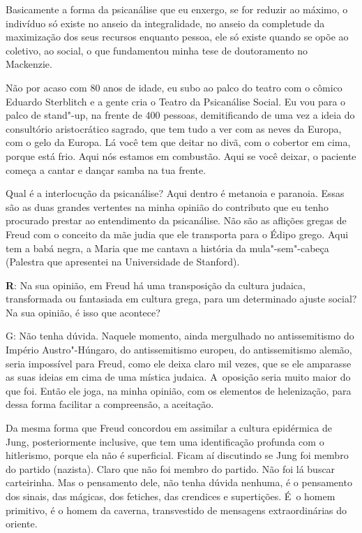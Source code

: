  

Basicamente a forma da psicanálise que eu enxergo, se for reduzir ao
máximo, o indivíduo só existe no anseio da integralidade, no anseio da
completude da maximização dos seus recursos enquanto pessoa, ele só
existe quando se opõe ao coletivo, ao social, o que fundamentou minha
tese de doutoramento no Mackenzie.

 

Não por acaso com 80 anos de idade, eu subo ao palco do teatro com o
cômico Eduardo Sterblitch e a gente cria o Teatro da Psicanálise Social.
Eu vou para o palco de stand"-up, na frente de 400 pessoas, demitificando
de uma vez a ideia do consultório aristocrático sagrado, que tem tudo a
ver com as neves da Europa, com o gelo da Europa. Lá você tem que deitar
no divã, com o cobertor em cima, porque está frio. Aqui nós estamos em
combustão. Aqui se você deixar, o paciente começa a cantar e dançar
samba na tua frente.

 

Qual é a interlocução da psicanálise? Aqui dentro é metanoia e paranoia.
Essas são as duas grandes vertentes na minha opinião do contributo que
eu tenho procurado prestar ao entendimento da psicanálise. Não são as
aflições gregas de Freud com o conceito da mãe judia que ele transporta
para o Édipo grego. Aqui tem a babá negra, a Maria que me cantava a
história da mula"-sem"-cabeça (Palestra que apresentei na Universidade de
Stanford).

 

\textbf{R}: Na sua opinião, em Freud há uma transposição da cultura
judaica, transformada ou fantasiada em cultura grega, para um
determinado ajuste social? Na sua opinião, é isso que acontece?

 

G: Não tenha dúvida. Naquele momento, ainda mergulhado no antissemitismo
do Império Austro"-Húngaro, do antissemitismo europeu, do antissemitismo
alemão, seria impossível para Freud, como ele deixa claro mil vezes, que
se ele amparasse as suas ideias em cima de uma mística judaica. A~oposição seria muito maior do que foi. Então ele joga, na minha opinião,
com os elementos de helenização, para dessa forma facilitar a
compreensão, a aceitação.

 

Da mesma forma que Freud concordou em assimilar a cultura epidérmica de
Jung, posteriormente inclusive, que tem uma identificação profunda com o
hitlerismo, porque ela não é superficial. Ficam aí discutindo se Jung
foi membro do partido (nazista). Claro que não foi membro do partido.
Não foi lá buscar carteirinha. Mas o pensamento dele, não tenha dúvida
nenhuma, é o pensamento dos sinais, das mágicas, dos fetiches, das
crendices e supertições. É~o homem primitivo, é o homem da caverna,
transvestido de mensagens extraordinárias do oriente.

